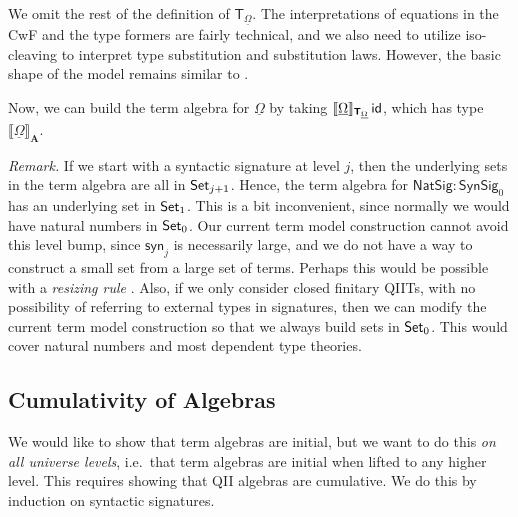 \documentclass[sigplan,review,anonymous]{acmart}\settopmatter{printfolios=true,printccs=false,printacmref=false}
\newcommand{\NatSig}{\mathsf{NatSig}}
\newcommand{\syn}{\mathsf{syn}}
\newcommand{\SynSig}{\mathsf{SynSig}}
\newcommand{\bA}{\boldsymbol{A}}
\newcommand{\bT}{\boldsymbol{\mathsf{T}}}
\newcommand{\ul}[1]{\underline{#1}}
\newcommand{\ulOmega}{\ul{\Omega}}
\newcommand{\llb}{\llbracket}
\newcommand{\rrb}{\rrbracket}
\begin{document}
\begin{definition}
We omit the rest of the definition of $\bT_{\ulOmega}$. The interpretations of
equations in the CwF and the type formers are fairly technical, and we also
need to utilize iso-cleaving to interpret type substitution and substitution
laws. However, the basic shape of the model remains similar to
\cite{kaposi2019constructing}.
\end{definition}

Now, we can build the term algebra for $\ulOmega$ by taking
$\llb\ulOmega\rrb_{\bT_{\ulOmega}}\,\id$, which has type $\llb\ulOmega\rrb_{\bA}$.

\emph{Remark.} If we start with a syntactic signature at level $j$, then the
underlying sets in the term algebra are all in $\mathsf{Set}_{j+1}$. Hence, the term
algebra for $\NatSig : \SynSig_0$ has an underlying set in $\mathsf{Set}_1$. This is
a bit inconvenient, since normally we would have natural numbers in $\mathsf{Set}_0$. Our
current term model construction cannot avoid this level bump, since $\syn_j$ is
necessarily large, and we do not have a way to construct a small set from
a large set of terms. Perhaps this would be possible with a \emph{resizing rule}
\cite{voevodsky2011resizing}. Also, if we only consider closed finitary QIITs,
with no possibility of referring to external types in signatures, then we can
modify the current term model construction so that we always build sets in
$\mathsf{Set}_0$. This would cover natural numbers and most dependent type theories.

\subsection{Cumulativity of Algebras}

We would like to show that term algebras are initial, but we want to do this
\emph{on all universe levels}, i.e.\ that term algebras are initial when lifted
to any higher level. This requires showing that QII algebras are
cumulative. We do this by induction on syntactic signatures.
\end{document}
